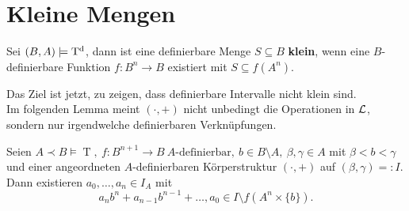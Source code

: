 \section{Kleine Mengen}
\begin{definition}
	Sei $(B,A)\models\operatorname{T^d}$, dann ist eine definierbare Menge $S\subseteq B$ \textbf{klein}, wenn eine $B$-definierbare Funktion $f:B^n\rightarrow B$ existiert mit $S\subseteq f(A^n)$.
\end{definition}

Das Ziel ist jetzt, zu zeigen, dass definierbare Intervalle nicht klein sind.\\
Im folgenden Lemma meint $(\cdot,+)$ nicht unbedingt die Operationen in $\mathcal{L}$, sondern nur irgendwelche definierbaren Verknüpfungen.

\begin{lemma}\label{Hilfsaussage Kleinheit}
	Seien $A\prec B\models\operatorname{T},\ f:B^{n+1}\rightarrow B\ A\text{-definierbar},\ b\in B\setminus A,\ {\beta,\gamma\in A}$ mit $\beta<b<\gamma$ und einer angeordneten $A$-definierbaren Körperstruktur $(\cdot,+)$ auf $(\beta,\gamma)=:I$. Dann existieren $a_0,\dots,a_n\in I_A$ mit $$a_nb^n+a_{n-1}b^{n-1}+\dots,a_0\in I\setminus f(A^n\times\{b\}).$$
\end{lemma}
